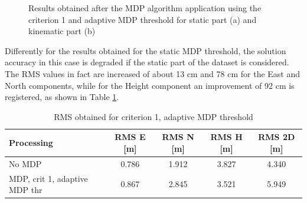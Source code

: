 \begin{figure}[H] 
	\centering
    \caption{Results obtained after the MDP algorithm application using the criterion 1 and adaptive MDP threshold for static part (a) and kinematic part (b)}
	\label{FIG:test3mdp_crit1mdpadaptive} 
\end{figure}

Differently for the results obtained for the static MDP threshold, the solution accuracy in this case is degraded if the static part of the dataset is considered. The RMS values in fact are increased of about 13 cm and 78 cm for the East and North components, while for 
the Height component an improvement of 92 cm is registered, as shown in Table \ref{tab:test3mpd_crit1_mdp_adaptive}. 

\begin{table}[H]
	\centering
	\begin{tabular}{|p{4.5cm}|c|c|c|c|}
	\hline
	\textbf{Processing} & \textbf{RMS E [m]} & \textbf{RMS N [m]} &
	\textbf{RMS H [m]}&
	\textbf{RMS 2D [m]}\\
    \hline
	No MDP & 0.786 & 1.912 & 3.827&4.340\\  
    \hline
	 MDP, crit 1, adaptive MDP thr & 0.867 & 2.845& 3.521&5.949\\ \hline
	\end{tabular} 
	\caption{RMS obtained for criterion 1, adaptive MDP threshold}
	\label{tab:test3mpd_crit1_mdp_adaptive}
\end{table}

